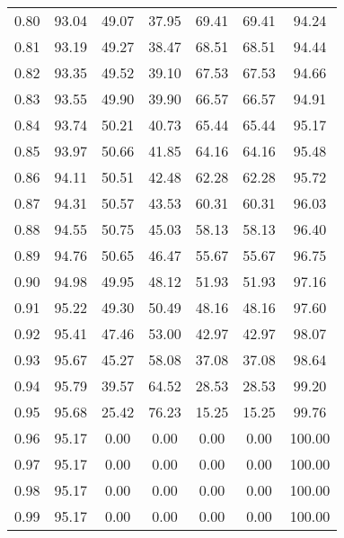 \begin{tabular}{|c|c|c|c|c|c|c|}
      0.80 &     93.04 &     49.07 &      37.95 &   69.41 &      69.41 &         94.24 \\
      0.81 &     93.19 &     49.27 &      38.47 &   68.51 &      68.51 &         94.44 \\
      0.82 &     93.35 &     49.52 &      39.10 &   67.53 &      67.53 &         94.66 \\
      0.83 &     93.55 &     49.90 &      39.90 &   66.57 &      66.57 &         94.91 \\
      0.84 &     93.74 &     50.21 &      40.73 &   65.44 &      65.44 &         95.17 \\
      0.85 &     93.97 &     50.66 &      41.85 &   64.16 &      64.16 &         95.48 \\
      0.86 &     94.11 &     50.51 &      42.48 &   62.28 &      62.28 &         95.72 \\
      0.87 &     94.31 &     50.57 &      43.53 &   60.31 &      60.31 &         96.03 \\
      0.88 &     94.55 &     50.75 &      45.03 &   58.13 &      58.13 &         96.40 \\
      0.89 &     94.76 &     50.65 &      46.47 &   55.67 &      55.67 &         96.75 \\
      0.90 &     94.98 &     49.95 &      48.12 &   51.93 &      51.93 &         97.16 \\
      0.91 &     95.22 &     49.30 &      50.49 &   48.16 &      48.16 &         97.60 \\
      0.92 &     95.41 &     47.46 &      53.00 &   42.97 &      42.97 &         98.07 \\
      0.93 &     95.67 &     45.27 &      58.08 &   37.08 &      37.08 &         98.64 \\
      0.94 &     95.79 &     39.57 &      64.52 &   28.53 &      28.53 &         99.20 \\
      0.95 &     95.68 &     25.42 &      76.23 &   15.25 &      15.25 &         99.76 \\
      0.96 &     95.17 &      0.00 &       0.00 &    0.00 &       0.00 &        100.00 \\
      0.97 &     95.17 &      0.00 &       0.00 &    0.00 &       0.00 &        100.00 \\
      0.98 &     95.17 &      0.00 &       0.00 &    0.00 &       0.00 &        100.00 \\
      0.99 &     95.17 &      0.00 &       0.00 &    0.00 &       0.00 &        100.00 \\
\bottomrule
\end{tabular}
